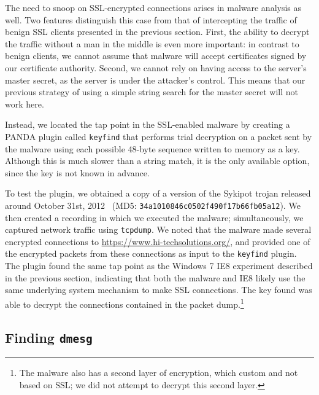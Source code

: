 The need to snoop on SSL-encrypted connections arises in malware
analysis as well. Two features distinguish this case from that of
intercepting the traffic of benign SSL clients presented in the previous
section. First, the ability to decrypt the traffic without a man in the
middle is even more important: in contrast to benign clients, we cannot
assume that malware will accept certificates signed by our certificate
authority. Second, we cannot rely on having access to the server's
master secret, as the server is under the attacker's control. This means
that our previous strategy of using a simple string search for the
master secret will not work here.

Instead, we located the tap point in the SSL-enabled malware by creating
a PANDA plugin called \texttt{keyfind} that performs trial decryption on
a packet sent by the malware using each possible 48-byte sequence
written to memory as a key.  Although this is much slower than a string
match, it is the only available option, since the key is not known in
advance.

To test the plugin, we obtained a copy of a version of the Sykipot
trojan released around October 31st, 2012~\cite{sandymal} (MD5:
\texttt{34a1010846c0502f490f17b66fb05a12}). We then created a recording
in which we executed the malware; simultaneously, we captured network
traffic using \texttt{tcpdump}. We noted that the malware made several
encrypted connections to \url{https://www.hi-techsolutions.org/}, and
provided one of the encrypted packets from these connections as input to
the \texttt{keyfind} plugin. The plugin found the same tap point as the
Windows 7 IE8 experiment described in the previous section, indicating
that both the malware and IE8 likely use the same underlying system
mechanism to make SSL connections. The key found was able to decrypt the
connections contained in the packet dump.\footnote{The malware also has
a second layer of encryption, which custom and not based on SSL; we did
not attempt to decrypt this second layer.}

\subsection{Finding \large \texttt{dmesg}}
\label{sec:eval:subsec:dmesg}

